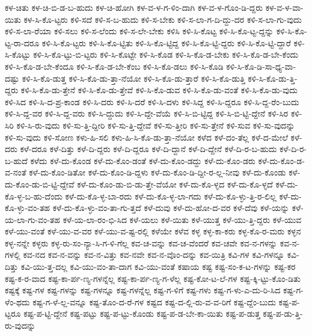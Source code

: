 {ಕಳ-ಚಿತು
ಕಳ-ಚಿ-ಬಿ-ಡ-ಬ-ಹುದು
ಕಳ-ಚಿ-ಹೋಗಿ
ಕಳ-ವ-ಳ-ಗ-ಳಿಂ-ದಾಗಿ
ಕಳ-ವ-ಳ-ಗೊಂ-ಡಿ-ದ್ದರು
ಕಳ-ವ-ಳ-ವಾ-ಯಿತು
ಕಳ-ಸಿ-ಕೊ-ಟ್ಟರು
ಕಳಿ-ಸದೆ
ಕಳಿ-ಸ-ಬ-ಹುದು
ಕಳಿ-ಸ-ಬೇಕು
ಕಳಿ-ಸ-ಲಾ-ಗ-ದಿ-ದ್ದು-ದರ
ಕಳಿ-ಸ-ಲಾ-ಗು-ವುದು
ಕಳಿ-ಸ-ಲಾ-ರೆಯಾ
ಕಳಿ-ಸಲು
ಕಳಿ-ಸ-ಲೆಂದು
ಕಳಿ-ಸ-ಲೇ-ಬೇಕು
ಕಳಿಸಿ
ಕಳಿ-ಸಿ-ಕೊಟ್ಟ
ಕಳಿ-ಸಿ-ಕೊ-ಟ್ಟ-ದ್ದನ್ನು
ಕಳಿ-ಸಿ-ಕೊ-ಟ್ಟ-ರಾ-ದರೂ
ಕಳಿ-ಸಿ-ಕೊ-ಟ್ಟರು
ಕಳಿ-ಸಿ-ಕೊ-ಟ್ಟಿತು
ಕಳಿ-ಸಿ-ಕೊ-ಟ್ಟಿದ್ದ
ಕಳಿ-ಸಿ-ಕೊ-ಟ್ಟಿ-ದ್ದರು
ಕಳಿ-ಸಿ-ಕೊ-ಟ್ಟಿ-ದ್ದಾರೆ
ಕಳಿ-ಸಿ-ಕೊಟ್ಟು
ಕಳಿ-ಸಿ-ಕೊ-ಟ್ಟು-ಬಿ-ಟ್ಟರು
ಕಳಿ-ಸಿ-ಕೊಟ್ಟೇ
ಕಳಿ-ಸಿ-ಕೊಡ
ಕಳಿ-ಸಿ-ಕೊ-ಡ-ಬೇಕು
ಕಳಿ-ಸಿ-ಕೊ-ಡ-ಬೇ-ಕೆಂದು
ಕಳಿ-ಸಿ-ಕೊ-ಡ-ಬೇ-ಕೆಂದೂ
ಕಳಿ-ಸಿ-ಕೊ-ಡ-ಬೇ-ಕೆಂಬ
ಕಳಿ-ಸಿ-ಕೊ-ಡಲು
ಕಳಿ-ಸಿ-ಕೊಡಿ
ಕಳಿ-ಸಿ-ಕೊ-ಡಿ-ಸಾ-ಧ್ಯ-ವಾ-ದಷ್ಟು
ಕಳಿ-ಸಿ-ಕೊ-ಡುತ್ತ
ಕಳಿ-ಸಿ-ಕೊ-ಡು-ತ್ತಾ-ನೆಯೋ
ಕಳಿ-ಸಿ-ಕೊ-ಡು-ತ್ತಾರೆ
ಕಳಿ-ಸಿ-ಕೊ-ಡುತ್ತಿ
ಕಳಿ-ಸಿ-ಕೊ-ಡು-ತ್ತಿ-ದ್ದರು
ಕಳಿ-ಸಿ-ಕೊ-ಡು-ತ್ತೇನೆ
ಕಳಿ-ಸಿ-ಕೊ-ಡು-ತ್ತೇವೆ
ಕಳಿ-ಸಿ-ಕೊ-ಡುವ
ಕಳಿ-ಸಿ-ಕೊ-ಡು-ವಂತೆ
ಕಳಿ-ಸಿ-ಕೊ-ಡು-ವುದು
ಕಳಿ-ಸಿದ
ಕಳಿ-ಸಿ-ದ-ಪ್ರ-ಕಾಂಡ
ಕಳಿ-ಸಿ-ದರು
ಕಳಿ-ಸಿ-ದರೆ
ಕಳಿ-ಸಿ-ದಳು
ಕಳಿ-ಸಿದ್ದ
ಕಳಿ-ಸಿ-ದ್ದರೂ
ಕಳಿ-ಸಿ-ದ್ದ-ರೆಂ-ಬುದು
ಕಳಿ-ಸಿ-ದ್ದ-ವರ
ಕಳಿ-ಸಿ-ದ್ದ-ವರು
ಕಳಿ-ಸಿ-ದ್ದುದು
ಕಳಿ-ಸಿ-ದ್ದೇ-ವೆಯೆ
ಕಳಿ-ಸಿ-ಬಿ-ಟ್ಟಿದ್ದ
ಕಳಿ-ಸಿ-ಬಿ-ಟ್ಟಿ-ದ್ದೇನೆ
ಕಳಿ-ಸಿರ
ಕಳಿ-ಸಿರಿ
ಕಳಿ-ಸಿ-ರು-ವುದು
ಕಳಿ-ಸು-ತ್ತಿ-ದ್ದೀರಿ
ಕಳಿ-ಸು-ತ್ತಿ-ದ್ದೇವೆ
ಕಳಿ-ಸು-ತ್ತೀರಿ
ಕಳಿ-ಸು-ತ್ತೇನೆ
ಕಳಿ-ಸುವ
ಕಳಿ-ಸು-ವುದನ್ನು
ಕಳಿ-ಸು-ವುದು
ಕಳಿ-ಸೋಣ
ಕಳು-ಹಿ-ಸಲಿ
ಕಳು-ಹಿ-ಸಿ-ಕೊ-ಡು-ತ್ತಾ-ನೆಯೋ
ಕಳೆದ
ಕಳೆ-ದಂ-ತೆಲ್ಲ
ಕಳೆ-ದ-ಮೇಲೆ
ಕಳೆ-ದರು
ಕಳೆ-ದರೂ
ಕಳೆ-ದಿತ್ತು
ಕಳೆ-ದಿ-ದ್ದರು
ಕಳೆ-ದಿ-ದ್ದರೂ
ಕಳೆ-ದಿ-ದ್ದಾನೆ
ಕಳೆ-ದಿ-ದ್ದೇನೆ
ಕಳೆ-ದಿ-ರ-ಬ-ಹುದು
ಕಳೆ-ದಿ-ರ-ಬ-ಹುದೆ
ಕಳೆದು
ಕಳೆ-ದು-ಕೊಂಡ
ಕಳೆ-ದು-ಕೊಂ-ಡಂತೆ
ಕಳೆ-ದು-ಕೊಂ-ಡದ್ದು
ಕಳೆ-ದು-ಕೊಂ-ಡರು
ಕಳೆ-ದು-ಕೊಂ-ಡ-ವ-ನಂತೆ
ಕಳೆ-ದು-ಕೊಂ-ಡಿತೋ
ಕಳೆ-ದು-ಕೊಂ-ಡಿ-ದ್ದಳು
ಕಳೆ-ದು-ಕೊಂ-ಡಿ-ದ್ದೀ-ರ-ಲ್ಲ-ನೀವು
ಕಳೆ-ದು-ಕೊಂಡು
ಕಳೆ-ದು-ಕೊಂ-ಡು-ಬಿ-ಟ್ಟಿ-ದ್ದೇವೆ
ಕಳೆ-ದು-ಕೊಂ-ಡು-ಬಿ-ಡು-ತ್ತೇ-ವೆಯೋ
ಕಳೆ-ದು-ಕೊ-ಳ್ಳದ
ಕಳೆ-ದು-ಕೊ-ಳ್ಳದೆ
ಕಳೆ-ದು-ಕೊ-ಳ್ಳ-ಬ-ಹು-ದೆಂದು
ಕಳೆ-ದು-ಕೊ-ಳ್ಳ-ಬಾ-ರದು
ಕಳೆ-ದು-ಕೊ-ಳ್ಳ-ಲಾ-ಗದು
ಕಳೆ-ದು-ಕೊ-ಳ್ಳು-ತ್ತಿ-ರ-ಲಿಲ್ಲ
ಕಳೆ-ದು-ಕೊ-ಳ್ಳು-ವಂ-ತಹ
ಕಳೆ-ದು-ಕೊ-ಳ್ಳು-ವಂ-ತಾ-ಗು-ತ್ತದೆ
ಕಳೆ-ದುವು
ಕಳೆ-ದು-ಹೋ-ದ-ವರ
ಕಳೆ-ದೆವು
ಕಳೆ-ಯನ್ನು
ಕಳೆ-ಯ-ಲಾ-ಗು-ವಂ-ತಹ
ಕಳೆ-ಯ-ಲಾ-ರಂ-ಭಿ-ಸಿದ
ಕಳೆ-ಯಲು
ಕಳೆ-ಯಿತು
ಕಳೆ-ಯುತ್ತ
ಕಳೆ-ಯು-ತ್ತಿ-ದ್ದರು
ಕಳೆ-ಯುವ
ಕಳೆ-ಯು-ವಂತೆ
ಕಳೆ-ಯು-ವ-ವರ
ಕಳೆ-ಯು-ವ-ಷ್ಟ-ರಲ್ಲಿ
ಕಳೆಯೇ
ಕಳೆವ
ಕಳ್ಳ
ಕಳ್ಳ-ಕಾ-ಕರು
ಕಳ್ಳ-ಕೊ-ರ-ಮರು
ಕಳ್ಳನ
ಕಳ್ಳ-ನನ್ನೇ
ಕಳ್ಳರು
ಕಳ್ಳ-ರು-ಸಂ-ನ್ಯಾ-ಸಿ-ಗ-ಳಿ-ಗೆಲ್ಲ
ಕವ-ಚ-ವನ್ನು
ಕವ-ಚ-ವೆಂದರೆ
ಕವ-ಚವೇ
ಕವ-ನ-ಗಳನ್ನು
ಕವ-ನ-ಗಳಲ್ಲಿ
ಕವ-ನದ
ಕವ-ನ-ವನ್ನು
ಕವ-ನ-ವಿತ್ತು
ಕವ-ನವೇ
ಕವ-ನ-ವೊಂ-ದನ್ನು
ಕವ-ಯಿತ್ರಿ
ಕವಿ-ಗಳ
ಕವಿ-ಗಳನ್ನೂ
ಕವಿ-ದಿತ್ತು
ಕವಿ-ಯು-ತ್ತ-ದಲ್ಲ
ಕವಿ-ಯು-ವಂ-ತಾ-ದಾಗ
ಕವಿ-ಯು-ವಂತೆ
ಕಷಾಯ
ಕಷ್ಟ
ಕಷ್ಟ-ಸಂ-ಕ-ಟ-ಗಳನ್ನು
ಕಷ್ಟ-ಕರ
ಕಷ್ಟ-ಕ-ರ-ವಾದ
ಕಷ್ಟ-ಕಾ-ರ್ಪ-ಣ್ಯ-ಗಳನ್ನೆಲ್ಲ
ಕಷ್ಟ-ಕಾ-ರ್ಪ-ಣ್ಯ-ಗ-ಳೆಲ್ಲ
ಕಷ್ಟ-ಕೋ-ಟ-ಲೆ-ಗಳ
ಕಷ್ಟ-ಕ್ಕಿ-ಟ್ಟು-ಕೊಂ-ಡಿತು
ಕಷ್ಟಕ್ಕೆ
ಕಷ್ಟ-ಗಳ
ಕಷ್ಟ-ಗಳನ್ನು
ಕಷ್ಟ-ಗಳನ್ನೂ
ಕಷ್ಟ-ಗಳನ್ನೆಲ್ಲ
ಕಷ್ಟ-ಗ-ಳಿಗೆ
ಕಷ್ಟ-ಗಳು
ಕಷ್ಟ-ಗ-ಳು-ಎ-ದು-ರಿ-ಸಿದ
ಕಷ್ಟ-ಗ-ಳೆಂ-ಥದು
ಕಷ್ಟ-ಗ-ಳೆ-ಲ್ಲ-ವನ್ನೂ
ಕಷ್ಟ-ತೊಂ-ದ-ರೆ-ಗಳ
ಕಷ್ಟದ
ಕಷ್ಟ-ದ-ಲ್ಲಿ-ರು-ವ-ವ-ರಿಗೆ
ಕಷ್ಟ-ದ್ದೆಂ-ಬುದು
ಕಷ್ಟ-ಪ-ಟ್ಟರೂ
ಕಷ್ಟ-ಪ-ಟ್ಟಿ-ದ್ದೇನೆ
ಕಷ್ಟ-ಪಟ್ಟು
ಕಷ್ಟ-ಪ-ಟ್ಟು-ಕೊಂಡು
ಕಷ್ಟ-ಪ-ಡ-ಬೇ-ಕಾ-ಯಿತು
ಕಷ್ಟ-ಪ-ಡುತ್ತ
ಕಷ್ಟ-ಪ-ಡು-ತ್ತಿ-ರು-ವುದನ್ನು
}
